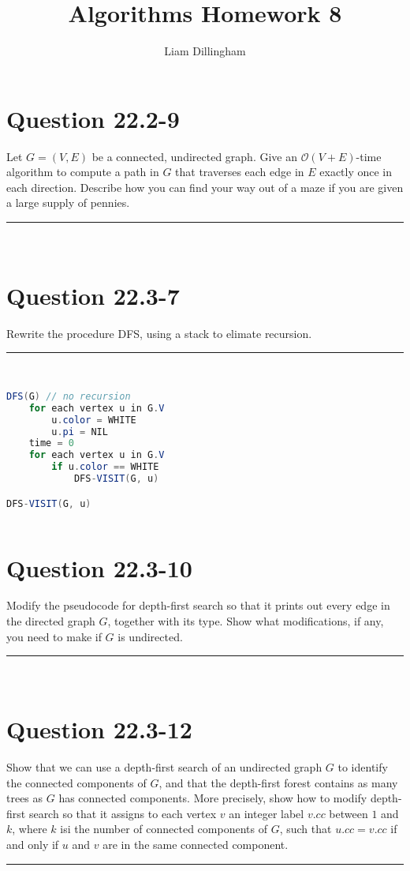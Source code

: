 \documentclass[20pt]{article} %
\title{Algorithms Homework 8}
\author{Liam Dillingham}
\begin{document}
\maketitle

\section{Question 22.2-9} 
Let $G = (V, E)$ be a connected, undirected graph. Give an $\mathcal{O}(V + E)$-time algorithm to compute a path in $G$ that traverses each edge in $E$ exactly once in each direction. Describe how you can find your way out of a maze if you are given a large supply of pennies. \\
\noindent\rule{2cm}{0.4pt} \\



\section{Question 22.3-7} 
Rewrite the procedure DFS, using a stack to elimate recursion. \\
\noindent\rule{2cm}{0.4pt} \\

\begin{lstlisting}[language=java]
DFS(G) // no recursion
	for each vertex u in G.V
		u.color = WHITE
		u.pi = NIL
	time = 0
	for each vertex u in G.V
		if u.color == WHITE
			DFS-VISIT(G, u)

DFS-VISIT(G, u)
	
\end{lstlisting}


\section{Question 22.3-10} 
Modify the pseudocode for depth-first search so that it prints out every edge in the directed graph $G$, together with its type. Show what modifications, if any, you need to make if $G$ is undirected. \\
\noindent\rule{2cm}{0.4pt} \\




\section{Question 22.3-12} 
Show that we can use a depth-first search of an undirected graph $G$ to identify the connected components of $G$, and that the depth-first forest contains as many trees as $G$ has connected components.  More precisely, show how to modify depth-first search so that it assigns to each vertex $v$ an integer label $v.cc$ between $1$ and $k$, where $k$ isi the number of connected components of $G$, such that $u.cc = v.cc$ if and only if $u$ and $v$ are in the same connected component. \\
\noindent\rule{2cm}{0.4pt} \\
\end{document}
